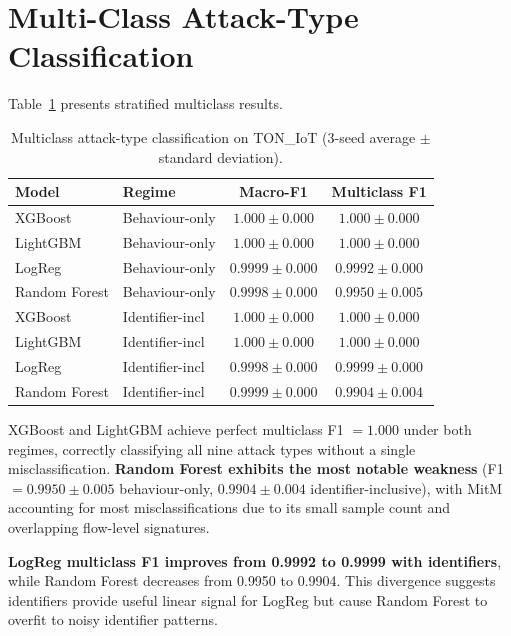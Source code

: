 \documentclass[12pt,a4paper]{report}
\begin{document}
\section{Multi-Class Attack-Type Classification}
\label{sec:multiclass-results}

Table~\ref{tab:multiclass} presents stratified multiclass results.

\begin{table}[H]
\centering
\caption{Multiclass attack-type classification on TON\_IoT (3-seed average $\pm$ standard deviation).}
\label{tab:multiclass}
\begin{tabular}{llcc}
\toprule
\textbf{Model} & \textbf{Regime} & \textbf{Macro-F1} & \textbf{Multiclass F1} \\
\midrule
XGBoost & Behaviour-only & $1.000 \pm 0.000$ & $1.000 \pm 0.000$ \\
LightGBM & Behaviour-only & $1.000 \pm 0.000$ & $1.000 \pm 0.000$ \\
LogReg & Behaviour-only & $0.9999 \pm 0.000$ & $0.9992 \pm 0.000$ \\
Random Forest & Behaviour-only & $0.9998 \pm 0.000$ & $0.9950 \pm 0.005$ \\
\midrule
XGBoost & Identifier-incl & $1.000 \pm 0.000$ & $1.000 \pm 0.000$ \\
LightGBM & Identifier-incl & $1.000 \pm 0.000$ & $1.000 \pm 0.000$ \\
LogReg & Identifier-incl & $0.9998 \pm 0.000$ & $0.9999 \pm 0.000$ \\
Random Forest & Identifier-incl & $0.9999 \pm 0.000$ & $0.9904 \pm 0.004$ \\
\bottomrule
\end{tabular}
\end{table}

XGBoost and LightGBM achieve perfect multiclass F1 $= 1.000$ under both regimes, correctly classifying all nine attack types without a single misclassification. \textbf{Random Forest exhibits the most notable weakness} (F1 $= 0.9950 \pm 0.005$ behaviour-only, $0.9904 \pm 0.004$ identifier-inclusive), with MitM accounting for most misclassifications due to its small sample count and overlapping flow-level signatures.

\textbf{LogReg multiclass F1 improves from 0.9992 to 0.9999 with identifiers}, while Random Forest decreases from 0.9950 to 0.9904. This divergence suggests identifiers provide useful linear signal for LogReg but cause Random Forest to overfit to noisy identifier patterns.
\end{document}

